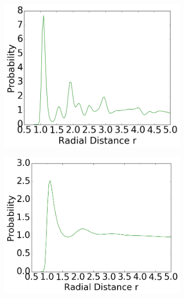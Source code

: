 \begin{figure}[ht]
\begin{subfigure}{0.3\textwidth}
\includegraphics[width=\textwidth]{../dat/meanRDF_T0d3_F20d0.png}
\end{subfigure}
\hfill
\begin{subfigure}{0.3\textwidth}
\includegraphics[width=\textwidth]{../dat/meanRDF_T1d0_F20d0.png}
\end{subfigure}
\hfill
\begin{subfigure}{0.3\textwidth}

\end{subfigure}
\end{figure}
